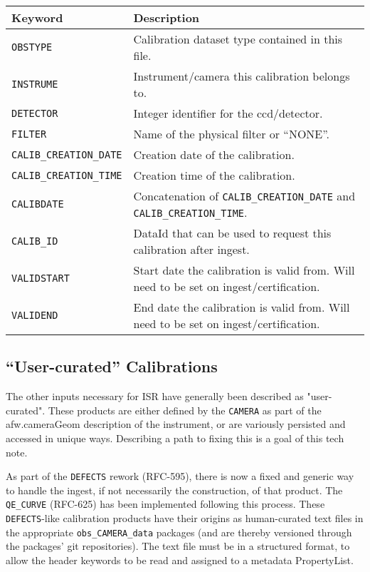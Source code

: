 \documentclass[DM,authoryear,toc]{lsstdoc}
\begin{document}
\begin{tabular}{l l}
  Keyword & Description \\
  \hline
  \verb|OBSTYPE| & Calibration dataset type contained in this file. \\
  \verb|INSTRUME| & Instrument/camera this calibration belongs to. \\
  \verb|DETECTOR| & Integer identifier for the ccd/detector. \\
  \verb|FILTER| & Name of the physical filter or ``NONE''. \\
  \verb|CALIB_CREATION_DATE| & Creation date of the calibration. \\
  \verb|CALIB_CREATION_TIME| & Creation time of the calibration. \\
  \verb|CALIBDATE| & Concatenation of \verb|CALIB_CREATION_DATE| and \verb|CALIB_CREATION_TIME|. \\
  \verb|CALIB_ID| & DataId that can be used to request this calibration after ingest. \\
  \verb|VALIDSTART| & Start date the calibration is valid from.  Will need to be set on ingest/certification. \\
  \verb|VALIDEND| & End date the calibration is valid from.  Will need to be set on ingest/certification. \\
\end{tabular}

\subsection{``User-curated'' Calibrations}

The other inputs necessary for ISR have generally been described as
"user-curated".  These products are either defined by the \verb|CAMERA| as
part of the afw.cameraGeom description of the instrument, or are
variously persisted and accessed in unique ways.  Describing a path to
fixing this is a goal of this tech note.

As part of the \verb|DEFECTS| rework (RFC-595), there is now a fixed and
generic way to handle the ingest, if not necessarily the construction,
of that product.  The \verb|QE_CURVE| (RFC-625) has been implemented
following this process.  These \verb|DEFECTS|-like calibration products have
their origins as human-curated text files in the appropriate
\verb|obs_CAMERA_data| packages (and are thereby versioned through the
packages' git repositories).  The text file must be in a structured
format, to allow the header keywords to be read and assigned to a
metadata PropertyList.
\end{document}
